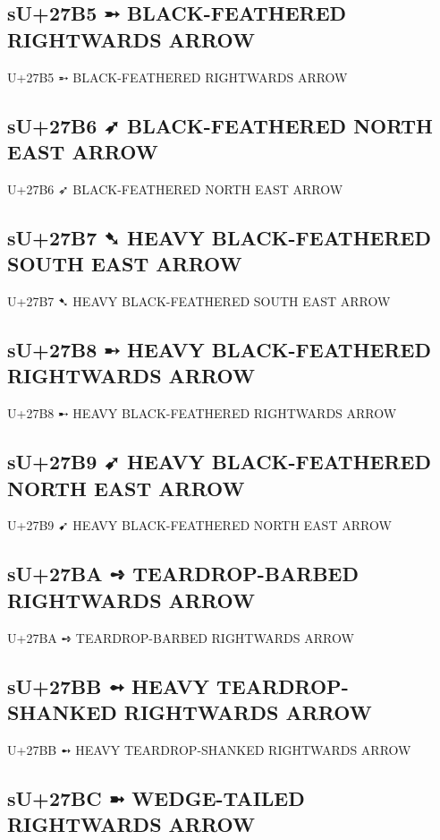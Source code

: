 \subsection{sU+27B5 ➵ BLACK-FEATHERED RIGHTWARDS ARROW}

U+27B5 ➵ BLACK-FEATHERED RIGHTWARDS ARROW

\subsection{sU+27B6 ➶ BLACK-FEATHERED NORTH EAST ARROW}

U+27B6 ➶ BLACK-FEATHERED NORTH EAST ARROW

\subsection{sU+27B7 ➷ HEAVY BLACK-FEATHERED SOUTH EAST ARROW}

U+27B7 ➷ HEAVY BLACK-FEATHERED SOUTH EAST ARROW

\subsection{sU+27B8 ➸ HEAVY BLACK-FEATHERED RIGHTWARDS ARROW}

U+27B8 ➸ HEAVY BLACK-FEATHERED RIGHTWARDS ARROW

\subsection{sU+27B9 ➹ HEAVY BLACK-FEATHERED NORTH EAST ARROW}

U+27B9 ➹ HEAVY BLACK-FEATHERED NORTH EAST ARROW

\subsection{sU+27BA ➺ TEARDROP-BARBED RIGHTWARDS ARROW}

U+27BA ➺ TEARDROP-BARBED RIGHTWARDS ARROW

\subsection{sU+27BB ➻ HEAVY TEARDROP-SHANKED RIGHTWARDS ARROW}

U+27BB ➻ HEAVY TEARDROP-SHANKED RIGHTWARDS ARROW

\subsection{sU+27BC ➼ WEDGE-TAILED RIGHTWARDS ARROW}

